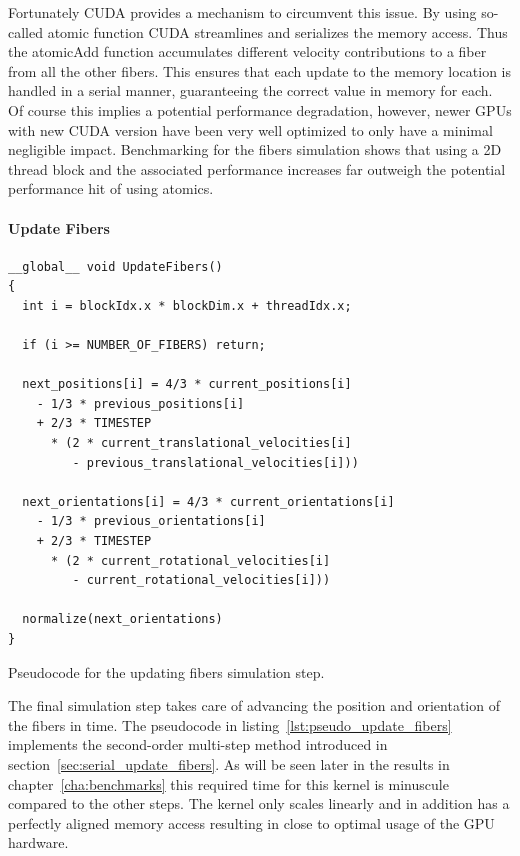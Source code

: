 \documentclass[a4paper,11pt]{kth-mag}
\begin{document}
Fortunately CUDA provides a mechanism to circumvent this issue. By using so-called atomic function CUDA streamlines and serializes the memory access. Thus the atomicAdd function accumulates different velocity contributions to a fiber from all the other fibers. This ensures that each update to the memory location is handled in a serial manner, guaranteeing the correct value in memory for each. Of course this implies a potential performance degradation, however, newer GPUs with new CUDA version have been very well optimized to only have a minimal negligible impact. Benchmarking for the fibers simulation shows that using a 2D thread block and the associated performance increases far outweigh the potential performance hit of using atomics.

\paragraph{Update Fibers}

\begin{listing}[!htbp]
  \centering
  \begin{verbatim}
__global__ void UpdateFibers()
{
  int i = blockIdx.x * blockDim.x + threadIdx.x;

  if (i >= NUMBER_OF_FIBERS) return;

  next_positions[i] = 4/3 * current_positions[i]
    - 1/3 * previous_positions[i]
    + 2/3 * TIMESTEP
      * (2 * current_translational_velocities[i]
         - previous_translational_velocities[i]))

  next_orientations[i] = 4/3 * current_orientations[i]
    - 1/3 * previous_orientations[i]
    + 2/3 * TIMESTEP
      * (2 * current_rotational_velocities[i]
         - current_rotational_velocities[i]))

  normalize(next_orientations)
}
  \end{verbatim}
  \caption{Pseudocode for the updating fibers simulation step.}
  \label{lst:pseudo_update_fibers}
\end{listing}

The final simulation step takes care of advancing the position and orientation of the fibers in time. The pseudocode in listing~\ref{lst:pseudo_update_fibers} implements the second-order multi-step method introduced in section~\ref{sec:serial_update_fibers}. As will be seen later in the results in chapter~\ref{cha:benchmarks} this required time for this kernel is minuscule compared to the other steps. The kernel only scales linearly and in addition has a perfectly aligned memory access resulting in close to optimal usage of the GPU hardware.
\end{document}
